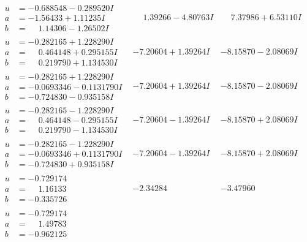 \documentclass[1p]{elsarticle_modified}
\theoremstyle{definition}
\begin{document}
$$\begin{array}{c|c|c}
\begin{aligned}
u &= -0.688548 - 0.289520 I \\
a &= -1.56433 + 1.11235 I \\
b &= \phantom{-}1.14306 - 1.26502 I\end{aligned}
 & \phantom{-}1.39266 - 4.80763 I & \phantom{-}7.37986 + 6.53110 I \\ \hline\begin{aligned}
u &= -0.282165 + 1.228290 I \\
a &= \phantom{-}0.464148 + 0.295155 I \\
b &= \phantom{-}0.219790 + 1.134530 I\end{aligned}
 & -7.20604 + 1.39264 I & -8.15870 - 2.08069 I \\ \hline\begin{aligned}
u &= -0.282165 + 1.228290 I \\
a &= -0.0693346 - 0.1131790 I \\
b &= -0.724830 - 0.935158 I\end{aligned}
 & -7.20604 + 1.39264 I & -8.15870 - 2.08069 I \\ \hline\begin{aligned}
u &= -0.282165 - 1.228290 I \\
a &= \phantom{-}0.464148 - 0.295155 I \\
b &= \phantom{-}0.219790 - 1.134530 I\end{aligned}
 & -7.20604 - 1.39264 I & -8.15870 + 2.08069 I \\ \hline\begin{aligned}
u &= -0.282165 - 1.228290 I \\
a &= -0.0693346 + 0.1131790 I \\
b &= -0.724830 + 0.935158 I\end{aligned}
 & -7.20604 - 1.39264 I & -8.15870 + 2.08069 I \\ \hline\begin{aligned}
u &= -0.729174\phantom{ +0.000000I} \\
a &= \phantom{-}1.16133\phantom{ +0.000000I} \\
b &= -0.335726\phantom{ +0.000000I}\end{aligned}
 & -2.34284\phantom{ +0.000000I} & -3.47960\phantom{ +0.000000I} \\ \hline\begin{aligned}
u &= -0.729174\phantom{ +0.000000I} \\
a &= \phantom{-}1.49783\phantom{ +0.000000I} \\
b &= -0.962125\phantom{ +0.000000I}\end{aligned}

\end{array}$$
\end{document}
